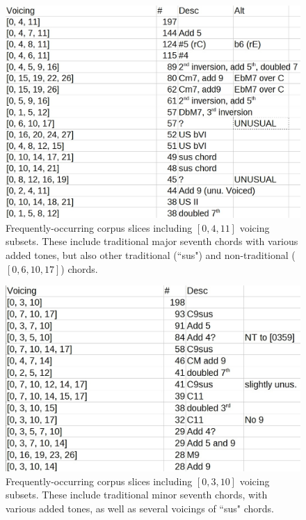 \begin{figure}[h!]
	\centering
	\includegraphics[width=5in]{0411_tones.jpg}
	\caption{Frequently-occurring corpus slices including $[0,4,11]$ voicing subsets.  These include traditional major seventh chords with various added tones, but also other traditional (``sus") and non-traditional ($[0,6,10,17]$) chords.}
	\label{[0,4,11]}
\end{figure}

\begin{figure}[h!]
	\centering
	\includegraphics[width=5in]{0310_tones.jpg}
	\caption{Frequently-occurring corpus slices including $[0,3,10]$ voicing subsets.  These include traditional minor seventh chords, with various added tones, as well as several voicings of ``sus" chords.}
	\label{[0,3,10]}
\end{figure}

